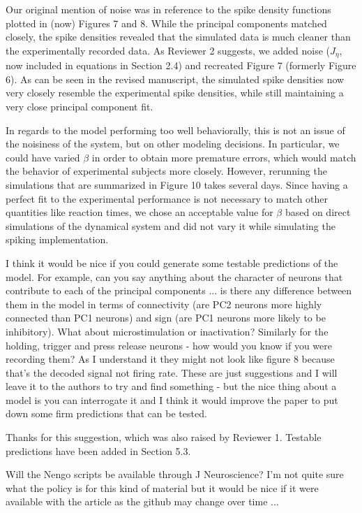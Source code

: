 \documentclass[11pt,paper=letter]{scrartcl}
\begin{document}
Our original mention of noise was in reference
to the spike density functions plotted
in (now) Figures 7 and 8.
While the principal components matched closely,
the spike densities revealed that
the simulated data is much cleaner
than the experimentally recorded data.
As Reviewer 2 suggests, we added noise
($J_\eta$, now included in equations
in Section 2.4)
and recreated Figure 7 (formerly Figure 6).
As can be seen in the revised manuscript,
the simulated spike densities now very closely resemble
the experimental spike densities,
while still maintaining a very close
principal component fit.

In regards to the model performing too well behaviorally,
this is not an issue of the noisiness of the system,
but on other modeling decisions.
In particular, we could have varied $\beta$
in order to obtain more premature errors,
which would match the behavior
of experimental subjects more closely.
However, rerunning the simulations
that are summarized in Figure 10
takes several days.
Since having a perfect fit
to the experimental performance
is not necessary to match other quantities
like reaction times,
we chose an acceptable value for $\beta$
based on direct simulations
of the dynamical system and
did not vary it while simulating the spiking implementation.

\begin{quoting}
  I think it would be nice if you could generate some testable
  predictions of the model. For example, can you say anything about
  the character of neurons that contribute to each of the principal
  components ... is there any difference between them in the model in
  terms of connectivity (are PC2 neurons more highly connected than
  PC1 neurons) and sign (are PC1 neurons more likely to be
  inhibitory). What about microstimulation or inactivation? Similarly
  for the holding, trigger and press release neurons - how would you
  know if you were recording them? As I understand it they might not
  look like figure 8 because that's the decoded signal not firing
  rate. These are just suggestions and I will leave it to the authors
  to try and find something - but the nice thing about a model is you
  can interrogate it and I think it would improve the paper to put
  down some firm predictions that can be tested.
\end{quoting}

Thanks for this suggestion,
which was also raised by Reviewer 1.
Testable predictions have been added in Section 5.3.

\begin{quoting}
  Will the Nengo scripts be available through J Neuroscience? I'm not
  quite sure what the policy is for this kind of material but it would
  be nice if it were available with the article as the github may
  change over time ...
\end{quoting}
\end{document}
